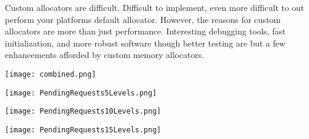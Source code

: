 \documentclass[12pt]{article}
\begin{document}
Custom allocators are difficult. Difficult to implement, even more difficult to out
perform your platforms default allocator. However, the reasons for custom
allocators are more than just performance.  Interesting debugging tools, fast
initialization, and more robust software though better testing are but a few
enhancements afforded by custom memory allocators. 





\begin{figure*}
    \begin{center}
        \texttt{[image: combined.png]}
        \label{fig:combinedlevels}
        \caption{}
    \end{center}
\end{figure*}


\begin{figure*}
    \begin{center}
        \texttt{[image: PendingRequests5Levels.png]}
        \label{fig:level5}
        \caption{}
    \end{center}
\end{figure*}


\begin{figure*}
    \begin{center}
        \texttt{[image: PendingRequests10Levels.png]}
        \label{fig:level10}
        \caption{}
    \end{center}
\end{figure*}


\begin{figure*}
    \begin{center}
        \texttt{[image: PendingRequests15Levels.png]}
        \label{fig:level15}
        \caption{}
    \end{center}
\end{figure*}
\end{document}
